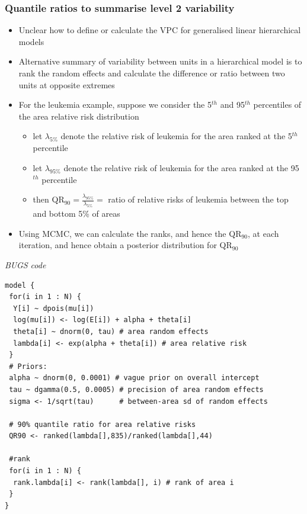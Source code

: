 \documentclass{beamer}
\newcommand{\bi}{\begin{itemize}}
\newcommand{\ei}{\end{itemize}}
\newcommand{\I}{\item}
\begin{document}
\begin{frame}
\frametitle{Quantile ratios to summarise level 2 variability}
\bi
\I Unclear how to define or calculate the VPC for generalised linear hierarchical models\vspace{1mm}
\I Alternative summary of variability between units in a hierarchical
model is to rank the random effects and calculate the difference or ratio between two
units at opposite extremes\vspace{1mm}
\I For the leukemia example, suppose we consider the 5$^{th}$ and 95$^{th}$ percentiles
of the area relative risk distribution\vspace{0.5mm}
\bi
\I  let $\lambda_{5\%}$ denote the relative risk of leukemia for the area ranked
at the 5$^{th}$ percentile\vspace{0.5mm}
\I  let $\lambda_{95\%}$ denote the relative risk of leukemia for the area ranked
at the 95$^{th}$ percentile\vspace{0.5mm}
\I then QR$_{90} = \frac{\lambda_{95\%}}{\lambda_{5\%}} = $ ratio of relative risks of leukemia between the top
and bottom 5\% of areas\vspace{1mm}
\ei
\I Using MCMC, we can calculate the ranks, and hence the QR$_{90}$, at each
iteration, and hence obtain a posterior distribution for QR$_{90}$
\ei
\end{frame}

\begin{frame}[fragile]
{\it BUGS code}
\begin{footnotesize}
\begin{verbatim}
model {
 for(i in 1 : N) {
  Y[i] ~ dpois(mu[i])
  log(mu[i]) <- log(E[i]) + alpha + theta[i]
  theta[i] ~ dnorm(0, tau) # area random effects
  lambda[i] <- exp(alpha + theta[i]) # area relative risk
 }
 # Priors:
 alpha ~ dnorm(0, 0.0001) # vague prior on overall intercept
 tau ~ dgamma(0.5, 0.0005) # precision of area random effects
 sigma <- 1/sqrt(tau)      # between-area sd of random effects

 # 90% quantile ratio for area relative risks
 QR90 <- ranked(lambda[],835)/ranked(lambda[],44)

 #rank
 for(i in 1 : N) {
  rank.lambda[i] <- rank(lambda[], i) # rank of area i
 }
}
\end{verbatim}
\end{footnotesize}
\end{frame}
\end{document}
